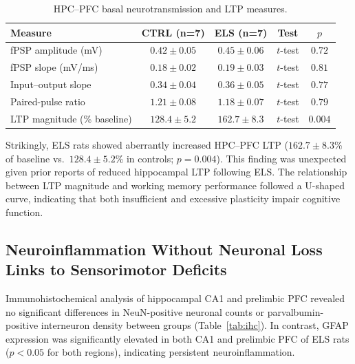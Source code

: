 \documentclass[11pt]{article}
\begin{document}
\begin{table}[H]
\centering
\caption{HPC--PFC basal neurotransmission and LTP measures.}
\label{tab:ltp}
\begin{tabular}{lcccc}
\toprule
\textbf{Measure} & \textbf{CTRL (n=7)} & \textbf{ELS (n=7)} & \textbf{Test} & \textbf{$p$} \\
\midrule
fPSP amplitude (mV) & $0.42 \pm 0.05$ & $0.45 \pm 0.06$ & $t$-test & $0.72$ \\
fPSP slope (mV/ms) & $0.18 \pm 0.02$ & $0.19 \pm 0.03$ & $t$-test & $0.81$ \\
Input--output slope & $0.34 \pm 0.04$ & $0.36 \pm 0.05$ & $t$-test & $0.77$ \\
Paired-pulse ratio & $1.21 \pm 0.08$ & $1.18 \pm 0.07$ & $t$-test & $0.79$ \\
LTP magnitude (\% baseline) & $128.4 \pm 5.2$ & $162.7 \pm 8.3$ & $t$-test & $0.004$ \\
\bottomrule
\end{tabular}
\end{table}

Strikingly, ELS rats showed aberrantly increased HPC--PFC LTP ($162.7 \pm 8.3$\% of baseline vs.\ $128.4 \pm 5.2$\% in controls; $p=0.004$). This finding was unexpected given prior reports of reduced hippocampal LTP following ELS. The relationship between LTP magnitude and working memory performance followed a U-shaped curve, indicating that both insufficient and excessive plasticity impair cognitive function.

\subsection{Neuroinflammation Without Neuronal Loss Links to Sensorimotor Deficits}

Immunohistochemical analysis of hippocampal CA1 and prelimbic PFC revealed no significant differences in NeuN-positive neuronal counts or parvalbumin-positive interneuron density between groups (Table~\ref{tab:ihc}). In contrast, GFAP expression was significantly elevated in both CA1 and prelimbic PFC of ELS rats ($p<0.05$ for both regions), indicating persistent neuroinflammation.
\end{document}
